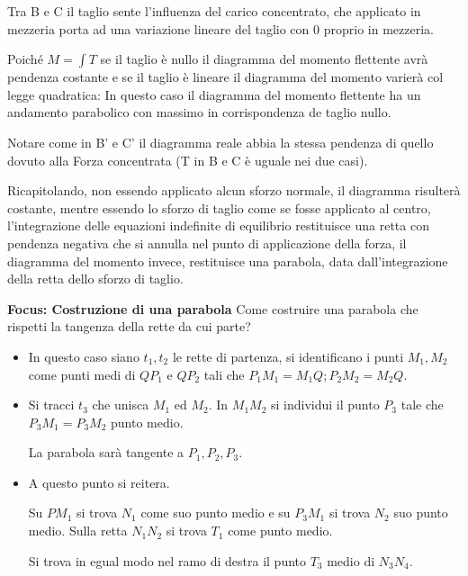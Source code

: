 \documentclass{article}
\begin{document}
\begin{adjustwidth}{2in}{}
 	Tra B e C il taglio sente l'influenza del carico concentrato, che applicato in mezzeria porta ad una variazione lineare del taglio con 0 proprio in mezzeria. 
 	
 	Poiché $M=\int T$ se il taglio è nullo il diagramma del momento flettente avrà pendenza costante e se il taglio è lineare il diagramma del momento varierà col legge quadratica: In questo caso il diagramma del momento flettente ha un andamento parabolico con massimo in corrispondenza de taglio nullo.  \newline
	
 	Notare come in B' e C' il diagramma reale abbia la
 	stessa pendenza di quello dovuto alla
	Forza concentrata (T in B e C è uguale
	nei due casi).
	
	Ricapitolando, non essendo applicato alcun sforzo normale, il diagramma risulterà costante, mentre essendo lo sforzo di taglio come se fosse applicato al centro, l'integrazione delle equazioni indefinite di equilibrio restituisce una retta con pendenza negativa che si annulla nel punto di applicazione della forza, il diagramma del momento invece, restituisce una parabola, data dall'integrazione della retta dello sforzo di taglio. \newpage
	
\textbf{Focus: Costruzione di una parabola}\newline
Come costruire una parabola che rispetti la tangenza della rette da cui parte? \newline 

\begin{itemize}
	\item In questo caso siano $t_1, t_2$ le rette di partenza, si identificano i punti $M_1, M_2$ come punti medi di $QP_1$ e $QP_2$ tali che $P_1M_1=M_1Q; P_2M_2=M_2Q$. 

\item Si tracci $t_3$ che unisca $ M_1 $ ed $ M_2 $. In $M_1M_2$ si individui il punto $P_3$ tale che $P_3M_1 = P_3M_2$ punto medio. \newline 

La parabola sarà tangente a $P_1, P_2, P_3$.

\item A questo punto si reitera. 

Su $PM_1$ si trova $N_1$ come suo punto medio e su $P_3M_1$ si trova $N_2$ suo punto medio. Sulla retta $N_1N_2$ si trova $T_1$ come punto medio. 

Si trova in egual modo nel ramo di destra il punto $T_3$ medio di $N_3N_4$. \newline


\end{itemize}
\end{adjustwidth}
\end{document}

